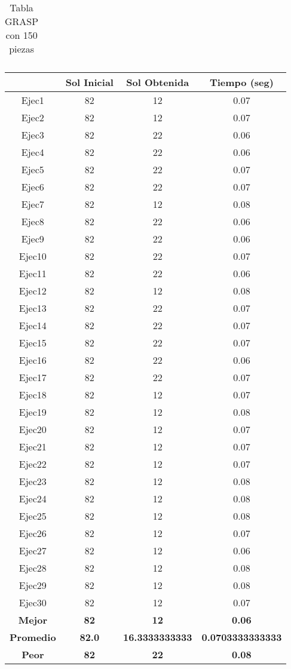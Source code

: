 \begin{center}
\begin{table}
\begin{tabular}{|c|c|c|c|}
\end{tabular}
\caption{Tabla GRASP con 150 piezas}
\end{table}

\begin{table}

\begin{tabular}{|c|c|c|c|}

\hline
 & {\bf Sol Inicial} & {\bf Sol Obtenida} & {\bf Tiempo (seg)} \\
\hline
Ejec1 & 82 & 12  & 0.07 \\
\hline
Ejec2 & 82 & 12  & 0.07 \\
\hline
Ejec3 & 82 & 22  & 0.06 \\
\hline
Ejec4 & 82 & 22  & 0.06 \\
\hline
Ejec5 & 82 & 22  & 0.07 \\
\hline
Ejec6 & 82 & 22  & 0.07 \\
\hline
Ejec7 & 82 & 12  & 0.08 \\
\hline
Ejec8 & 82 & 22  & 0.06 \\
\hline
Ejec9 & 82 & 22  & 0.06 \\
\hline
Ejec10 & 82 & 22  & 0.07 \\
\hline
Ejec11 & 82 & 22  & 0.06 \\
\hline
Ejec12 & 82 & 12  & 0.08 \\
\hline
Ejec13 & 82 & 22  & 0.07 \\
\hline
Ejec14 & 82 & 22  & 0.07 \\
\hline
Ejec15 & 82 & 22  & 0.07 \\
\hline
Ejec16 & 82 & 22  & 0.06 \\
\hline
Ejec17 & 82 & 22  & 0.07 \\
\hline
Ejec18 & 82 & 12  & 0.07 \\
\hline
Ejec19 & 82 & 12  & 0.08 \\
\hline
Ejec20 & 82 & 12  & 0.07 \\
\hline
Ejec21 & 82 & 12  & 0.07 \\
\hline
Ejec22 & 82 & 12  & 0.07 \\
\hline
Ejec23 & 82 & 12  & 0.08 \\
\hline
Ejec24 & 82 & 12  & 0.08 \\
\hline
Ejec25 & 82 & 12  & 0.08 \\
\hline
Ejec26 & 82 & 12  & 0.07 \\
\hline
Ejec27 & 82 & 12  & 0.06 \\
\hline
Ejec28 & 82 & 12  & 0.08 \\
\hline
Ejec29 & 82 & 12  & 0.08 \\
\hline
Ejec30 & 82 & 12  & 0.07 \\
\hline
{\bf Mejor} & {\bf 82} & {\bf 12} & {\bf 0.06} \\
\hline
{\bf Promedio} & {\bf 82.0} & {\bf 16.3333333333} & {\bf 0.0703333333333} \\
\hline
{\bf Peor} & {\bf 82} & {\bf 22} & {\bf 0.08} \\
\hline


\end{tabular}
\end{table}
\end{center}
